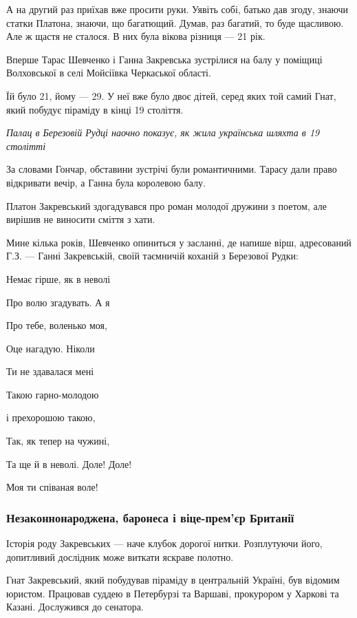 \documentclass[a4paper,11pt]{extreport}
\begin{document}
А на другий раз приїхав вже просити руки. Уявіть собі, батько дав згоду, знаючи
статки Платона, знаючи, що багатющий. Думав, раз багатий, то буде щасливою. Але
ж щастя не сталося. В них була вікова різниця --- 21 рік. 

Вперше Тарас Шевченко і Ганна Закревська зустрілися на балу у поміщиці
Волховської в селі Мойсіївка Черкаської області. 

Їй було 21, йому --- 29. У неї вже було двоє дітей, серед яких той самий Гнат,
який побудує піраміду в кінці 19 століття.

\emph{Палац в Березовій Рудці наочно показує, як жила українська шляхта в 19 столітті}

За словами Гончар, обставини зустрічі були романтичними. Тарасу дали право
відкривати вечір, а Ганна була королевою балу.

Платон Закревський здогадувався про роман молодої дружини з поетом, але вирішив
не виносити сміття з хати.

Мине кілька років, Шевченко опиниться у засланні, де напише вірш, адресований
Г.З. --- Ганні Закревській, своїй таємничій коханій з Березової Рудки:

Немає гірше, як в неволі

\begin{multicols}{2}
	\obeycr
	\restorecr
Про волю згадувать. А я

Про тебе, воленько моя,

Оце нагадую. Ніколи

Ти не здавалася мені

Такою гарно-молодою

і прехорошою такою,

Так, як тепер на чужині,

Та ще й в неволі. Доле! Доле!

Моя ти співаная воле!
\end{multicols}

\subsubsection{Незаконнонароджена, баронеса і віце-прем'єр Британії}

Історія роду Закревських --- наче клубок дорогої нитки. Розплутуючи його,
допитливий дослідник може виткати яскраве полотно.

Гнат Закревський, який побудував піраміду в центральній Україні, був відомим
юристом. Працював суддею в Петербурзі  та Варшаві, прокурором у Харкові та
Казані. Дослужився до сенатора.
\end{document}
